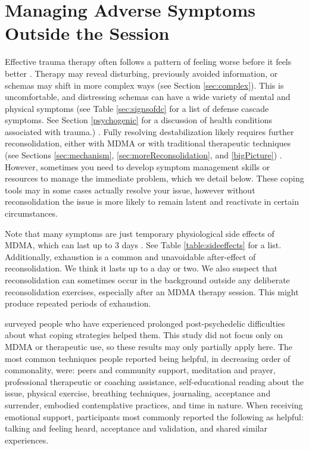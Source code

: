 \documentclass[12pt,letterpaper]{book}
\begin{document}
\section{Managing Adverse Symptoms Outside the Session}
\label{sectionManagement}
Effective trauma therapy often follows a pattern of feeling worse before it feels better \cite{olthofDestabilization}. Therapy may reveal disturbing, previously avoided information, or schemas may shift in more complex ways (see Section \ref{sec:complex}). This is uncomfortable, and distressing schemas can have a wide variety of mental and physical symptoms (see Table \ref{sec:signsofdc} for a list of defense cascade symptoms. See Section \ref{psychogenic} for a discussion of health conditions associated with trauma.) \cite{kroenkeSomatic,henningsenSomatic}. Fully resolving destabilization likely requires further reconsolidation, either with MDMA or with traditional therapeutic techniques (see Sections \ref{sec:mechanism}, \ref{sec:moreReconsolidation}, and \ref{bigPicture}) \cite{hayes2020complex,friston2010free}. However, sometimes you need to develop symptom management skills or resources to manage the immediate problem, which we detail below. These coping tools may in some cases actually resolve your issue, however without reconsolidation the issue is more likely to remain latent and reactivate in certain circumstances.

Note that many symptoms are just temporary physiological side effects of MDMA, which can last up to 3 days \cite{liechtiGender}. See Table \ref{table:sideeffects} for a list. Additionally, exhaustion is a common and unavoidable after-effect of reconsolidation. We think it lasts up to a day or two. We also suspect that reconsolidation can sometimes occur in the background outside any deliberate reconsolidation exercises, especially after an MDMA therapy session. This might produce repeated periods of exhaustion.

\textcite{robinson2024coming} surveyed people who have experienced prolonged post-psychedelic difficulties about what coping strategies helped them. This study did not focus only on MDMA or therapeutic use, so these results may only partially apply here. The most common techniques people reported being helpful, in decreasing order of commonality, were: peers and community support, meditation and prayer, professional therapeutic or coaching assistance, self-educational reading about the issue, physical exercise, breathing techniques, journaling, acceptance and surrender, embodied contemplative practices, and time in nature. When receiving emotional support, participants most commonly reported the following as helpful: talking and feeling heard, acceptance and validation, and shared similar experiences.
\end{document}
